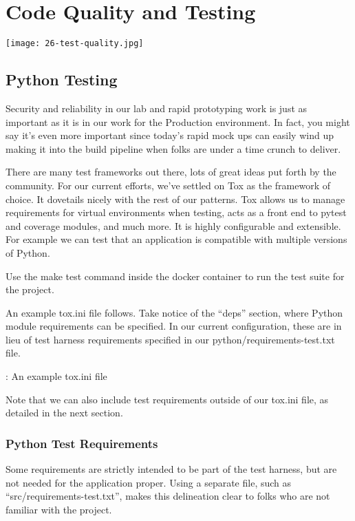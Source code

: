 \chapter{Code Quality and Testing}

\texttt{[image: 26-test-quality.jpg]}

\section{Python Testing}

\justifying
Security and reliability in our lab and rapid prototyping work is just as important as it is in our work for the Production environment.
In fact, you might say it's even more important since today's rapid mock ups
can easily wind up making it into the build pipeline when folks are under a time crunch to deliver.

\justifying
There are many test frameworks out there, lots of great ideas put forth by the community. For our current
efforts, we've settled on Tox as the framework of choice. It dovetails nicely with the rest of
our patterns. Tox allows us to manage requirements for virtual environments when testing, acts as a front
end to pytest and coverage modules, and much more. It is highly configurable and extensible. For example
we can test that an application is compatible with multiple versions of Python.

\justifying
Use the make test command inside the docker container to run the test suite for the project.

\justifying
An example tox.ini file follows. Take notice of the ``deps'' section,
where Python module requirements can be specified. In our current configuration,
these are in lieu of test harness requirements specified in our
python/requirements-test.txt file.

\begin{mybox}{\thetcbcounter: An example tox.ini file}
	
\end{mybox}

\justifying
Note that we can also include test requirements outside of our tox.ini file, as detailed in the next section.

\subsection{Python Test Requirements}

\justifying
Some requirements are strictly intended to be part of the test harness, but are not needed for the application proper. Using a separate file, such as
``src/requirements-test.txt'', makes this delineation clear to folks who are not familiar with the project.

